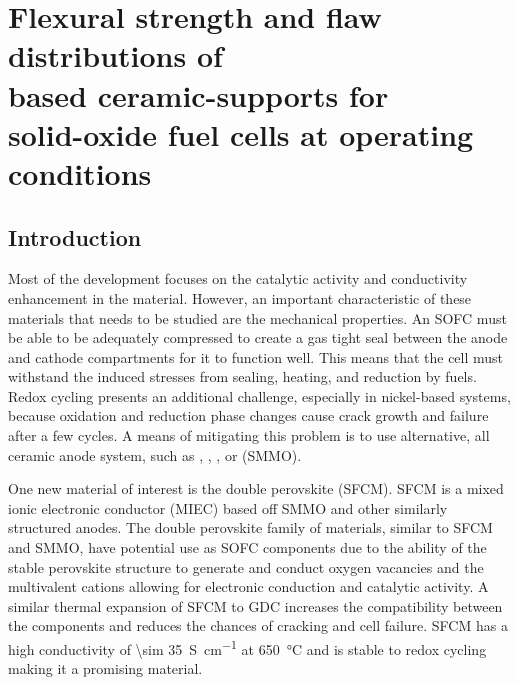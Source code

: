 
\chapter[Flexural strength and flaw distributions of \ce{SrFe_{0.2}Co_{0.4}Mo_{0.4}O_{3}} based ceramic-supports for solid-oxide fuel cells at operating conditions]{Flexural strength and flaw distributions of\\  based ceramic-supports for \\solid-oxide fuel cells at operating conditions}

\section{Introduction}
    Most of the development focuses on the catalytic activity and conductivity enhancement in the material.
    However, an important characteristic of these materials that needs to be studied are the mechanical properties.
    An SOFC must be able to be adequately compressed to create a gas tight seal between the anode and cathode compartments for it to function well.
    This means that the cell must withstand the induced stresses from sealing, heating, and reduction by fuels.
    Redox cycling presents an additional challenge, especially in nickel-based systems, because oxidation and reduction phase changes cause crack growth and failure after a few cycles.\cite{Radovic2004, Radovic2004b, Laurencin2010, Pihlatie2009, Laurencin2009, Yu2007, Sarantaridis2007}
    A means of mitigating this problem is to use alternative, all ceramic anode system, such as , , , or  (SMMO).\cite{Goodenough2007,Zha2005,Primdahl2001,Hussain2013,MohammedHussain2012,Hussain2016,Huang2006}

    One new material of interest is the double perovskite  (SFCM).\cite{Hussain,Hussaina,Pan}
    SFCM is a mixed ionic electronic conductor (MIEC) based off SMMO and other similarly structured anodes.
    The double perovskite family of materials, similar to SFCM and SMMO, have potential use as SOFC components due to the ability of the stable perovskite structure to generate and conduct oxygen vacancies and the multivalent cations allowing for electronic conduction and catalytic activity. \cite{Bernuy-Lopez2007, Huang2006a, Zhang2012}
    A similar thermal expansion of SFCM to GDC increases the compatibility between the components and reduces the chances of cracking and cell failure.
    SFCM has a high conductivity of \SI{\sim 35}{S\per\centi\meter} at \SI{650}{\celsius} and is stable to redox cycling making it a promising material.

